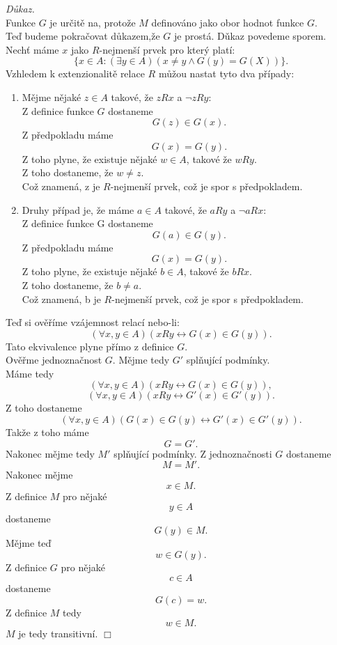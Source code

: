 \documentclass[12pt,a4paper]{article}
\newenvironment{proof}
{\noindent \textit{D\r{u}kaz.}}
{\hspace*{\fill} $\Box$}
\begin{document}
\begin{proof}
~\\
Funkce $G$ je ur\v{c}it\v{e} na, proto\v{z}e $M$ definov\'{a}no jako obor hodnot funkce $G$.\\
Te\v{d} budeme pokra\v{c}ovat d\r{u}kazem,\v{z}e $G$ je prost\'{a}. D\v{u}kaz povedeme sporem.\\
Nech\v{t} m\'{a}me $x$ jako $R$-nejmen\v{s}\'{i} prvek pro kter\'{y} plat\'{i}:
\[ \{x \in A:(\exists y \in A)(x\neq y \wedge G(y)=G(X))\} .\]
\newpage
Vzhledem k extenzionalit\v{e} relace $R$ m\r{u}\v{z}ou nastat tyto dva p\v{r}\'{i}pady:
\begin{enumerate}
  \item M\v{e}jme n\v{e}jak\'{e} $ z \in A $ takov\'{e}, \v{z}e $ zRx  $ a $  \neg zRy $:\\
  Z definice funkce $ G $ dostaneme
  \[ G(z) \in G(x) .\]
  Z p\v{r}edpokladu m\'{a}me 
  \[ G(x)=G(y) .\]
  Z toho plyne, \v{z}e existuje n\v{e}jak\'{e} $ w \in A $, takov\'{e} \v{z}e $  wRy $.\\
  Z toho dostaneme, \v{z}e $ w \neq z $.\\
  Co\v{z} znamen\'{a}, z je $R$-nejmen\v{s}\'{i} prvek, co\v{z} je spor s p\v{r}edpokladem.
  \item Druhy p\v{r}\'{i}pad je, \v{z}e m\'{a}me $ a \in A $ takov\'{e}, \v{z}e $ aRy  $ a $  \neg aRx $:\\
   Z definice funkce G dostaneme
  \[ G(a) \in G(y) .\]
  Z p\v{r}edpokladu m\'{a}me 
  \[ G(x)=G(y) .\]
  Z toho plyne, \v{z}e existuje n\v{e}jak\'{e} $ b \in A $, takov\'{e} \v{z}e $  bRx $.\\
  Z toho dostaneme, \v{z}e $ b \neq a $.\\
  Co\v{z} znamen\'{a}, b je $R$-nejmen\v{s}\'{i} prvek, co\v{z} je spor s p\v{r}edpokladem.
\end{enumerate}
Te\v{d} si ov\v{e}\v{r}\'{i}me vz\'{a}jemnost relac\'{i} nebo-li:
\[ (\forall x,y \in A)(xRy \leftrightarrow G(x) \in G(y)).  \]
Tato ekvivalence plyne p\v{r}\'{i}mo z definice $G$.\\
Ov\v{e}\v{r}me jednozna\v{c}nost $G$. M\v{e}jme tedy $G'$ spl\v{n}uj\'{i}c\'{i} podm\'{i}nky. \\
M\'{a}me tedy
\[ (\forall x,y \in A)(xRy \leftrightarrow G(x) \in G(y)),  \]
\[ (\forall x,y \in A)(xRy \leftrightarrow G'(x) \in G'(y)).  \]
Z toho dostaneme
\[  (\forall x,y \in A)(G(x) \in G(y) \leftrightarrow G'(x) \in G'(y)) .\]
Tak\v{z}e z toho m\'{a}me 
\[ G=G' .\]
Nakonec m\v{e}jme tedy $ M'$ spl\v{n}uj\'{i}c\'{i} podm\'{i}nky.
Z jednozna\v{c}nosti $G$ dostaneme \[ M=M' .\]
Nakonec m\v{e}jme  \[ x \in M  .\] Z definice $M$  pro n\v{e}jak\'{e}  \[ y \in A  \] dostaneme \[ G(y) \in M  .\]
M\v{e}jme te\v{d}  \[ w \in G(y)  .\] Z definice $G$ pro n\v{e}jak\'{e} \[  c \in A \]  dostaneme  \[ G(c)=w  .\]
Z definice $M$ tedy \[ w \in M . \]
$M$ je tedy transitivn\'{i}.
\end{proof}
\end{document}
